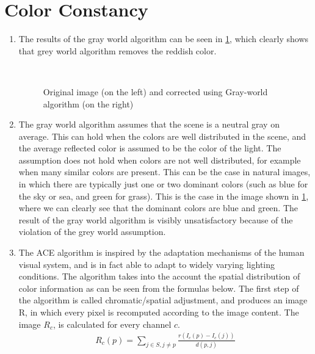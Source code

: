 \documentclass{article}
\begin{document}
\section{Color Constancy}




\begin{enumerate}
    \item The results of the gray world algorithm can be seen in \cref{fig:awb}, which clearly shows that grey world algorithm removes the reddish color.
    \begin{figure}[h]
        \centering
    \caption{Original image (on the left) and corrected using Gray-world algorithm (on the right) }
    \\
    \label{fig:awb}
\end{figure}

    \item The gray world algorithm assumes that the scene is a neutral gray on average. This can hold when the colors are well distributed in the scene, and the average reflected color is assumed to be the color of the light. The assumption does not hold when colors are not well distributed, for example when many similar colors are present. This can be the case in natural images, in which there are typically just one or two dominant colors (such as blue for the sky or sea, and green for grass). This is the case in the image shown in \cref{fig:awb}, where we can clearly see that the dominant colors are blue and green. The result of the gray world algorithm is visibly unsatisfactory because of the violation of the grey world assumption.
    
    
    \item The ACE algorithm \cite{ace2002} is inspired by the adaptation mechanisms of the human visual system, and is in fact able to adapt to widely varying lighting conditions. The algorithm takes into the account the spatial distribution of color information as can be seen from the formulas below. The first step of the algorithm is called chromatic/spatial adjustment, and produces an image R, in which every pixel is recomputed according to the image content. The image $R_c$, is calculated for every channel $c$.
    \begin{align*}
        R_c (p) = \sum_{j \in S, j \neq p} \frac{r(I_c(p) - I_c(j))}{d(p, j)}
    \end{align*}
    

\end{enumerate}
\end{document}
